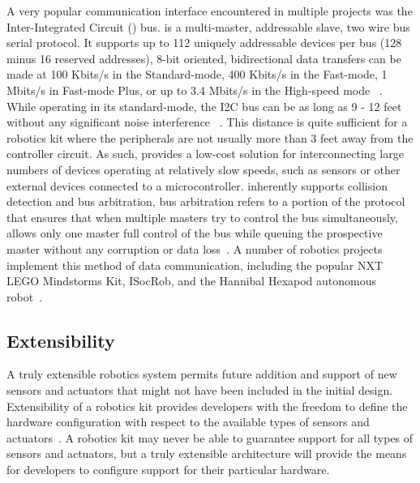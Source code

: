 A very popular communication interface encountered in multiple projects was the Inter-Integrated Circuit (\iic) bus. \iic is a multi-master, addressable slave, two wire bus serial protocol. It supports up to 112 uniquely addressable devices per bus (128 minus 16 reserved addresses), 8-bit oriented, bidirectional data transfers can be made at 100 Kbits/s in the Standard-mode, 400 Kbits/s in the Fast-mode, 1 Mbits/s in Fast-mode Plus, or up to 3.4 Mbits/s in the High-speed mode ~\parencite{edubots, i2cfaq}. While operating in its standard-mode, the I2C bus can be as long as 9 - 12 feet without any significant noise interference ~\parencite{hannibal}. This distance is quite sufficient for a robotics kit where the peripherals are not usually more than 3 feet away from the controller circuit. As such, \iic provides a low-cost solution for interconnecting large numbers of devices operating at relatively slow speeds, such as sensors or other external devices connected to a microcontroller. \iic inherently supports collision detection and bus arbitration, bus arbitration refers to a portion of the protocol that ensures that when multiple masters try to control the bus simultaneously, \iic allows only one master full control of the bus while queuing the prospective master without any corruption or data loss~\parencite{nxpi2c}.  A number of robotics projects implement this method of data communication, including the popular NXT LEGO Mindstorms Kit, ISocRob, and the Hannibal Hexapod autonomous robot~\parencite{hannibal, Ventura}.




\subsection{Extensibility} %
\label{sub:extensibility}
A truly extensible robotics system permits future addition and support of new sensors and actuators that might not have been included in the initial design. Extensibility of a robotics kit provides developers with the freedom to define the hardware configuration with respect to the available types of sensors and actuators~\parencite{rdk}. A robotics kit may never be able to guarantee support for all types of sensors and actuators, but a truly extensible architecture will provide the means for developers to configure support for their particular hardware. 


